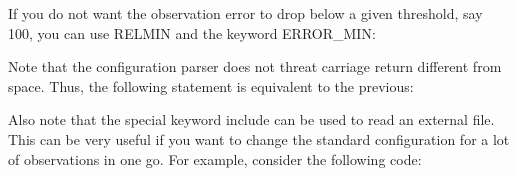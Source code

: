 \documentclass[letterpaper,10pt,english]{sphinxmanual}
\begin{document}
%
\begin{sphinxVerbatim}[commandchars=\\\{\}]
 
           
      
\end{sphinxVerbatim}

If you do not want the observation error to drop below a given
threshold, say 100, you can use RELMIN and the keyword ERROR\_MIN:

%
\begin{sphinxVerbatim}[commandchars=\\\{\}]
 
           
      
       
\end{sphinxVerbatim}

Note that the configuration parser does not threat carriage return
different from space. Thus, the following statement is equivalent to
the previous:

%
\begin{sphinxVerbatim}[commandchars=\\\{\}]
            
\end{sphinxVerbatim}

Also note that the special keyword include can be used to read an
external file. This can be very useful if you want to change the
standard configuration for a lot of observations in one go. For
example, consider the following code:
\end{document}
